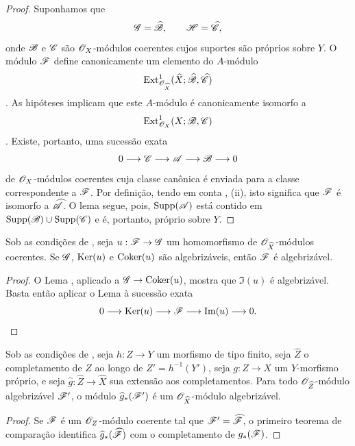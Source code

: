 \begin{proof}
Suponhamos que
\[
  \mathscr{G}=\widehat{\mathscr{B}},
  \qquad
  \mathscr{H}=\widehat{\mathscr{C}},
\]
onde $\mathscr{B}$ e $\mathscr{C}$ são $\mathscr{O}_X$-módulos coerentes cujos
suportes são próprios sobre $Y$. O módulo $\mathscr{F}$ define canonicamente
um elemento do $A$-módulo
\[
  \operatorname{Ext}^1_{\mathscr{O}_{\widehat{X}}}
  (\widehat{X};\widehat{\mathscr{B}},\widehat{\mathscr{C}})
\]
. As hipóteses implicam que este $A$-módulo é
canonicamente isomorfo a
\[
  \operatorname{Ext}^1_{\mathscr{O}_X}(X;\mathscr{B},\mathscr{C})
\]
. Existe, portanto, uma sucessão exata
\[
  0\longrightarrow\mathscr{C}\longrightarrow\mathscr{A}
  \longrightarrow\mathscr{B}\longrightarrow0
\]
de $\mathscr{O}_X$-módulos coerentes cuja classe canônica é enviada para a
classe correspondente a $\mathscr{F}$. Por definição, tendo em conta
, (ii), isto significa que $\mathscr{F}$ é isomorfo a
$\widehat{\mathscr{A}}$. O lema segue, pois,
$\operatorname{Supp}(\mathscr{A})$ está contido em
$\operatorname{Supp}(\mathscr{B})\cup\operatorname{Supp}(\mathscr{C})$ e é, portanto, próprio sobre $Y$.
\end{proof}

\begin{corollary}[5.3.2]
\label{III.5.3.2}
Sob as condições de , seja
$u:\sh{F}\to\sh{G}$ um homomorfismo de
$\mathscr{O}_{\widehat{X}}$-módulos coerentes. Se $\mathscr{G}$, $\operatorname{Ker}(u)$ e
$\operatorname{Coker}(u)$ são algebrizáveis, então $\mathscr{F}$ é algebrizável.
\end{corollary}

\begin{proof}
O Lema , aplicado a
$\sh{G}\to\Coker(u)$, mostra que $\Im(u)$ é algebrizável. Basta então
aplicar o Lema  à sucessão exata
\[
  0\longrightarrow\operatorname{Ker}(u)\longrightarrow\mathscr{F}
  \longrightarrow\operatorname{Im}(u)\longrightarrow0.
\]
\end{proof}

\begin{lemma}[5.3.3]
\label{III.5.3.3}
Sob as condições de , seja $h:Z\to Y$ um
morfismo de tipo finito, seja $\widehat{Z}$ o completamento de $Z$
ao longo de $Z'=h^{-1}(Y')$, seja $g:Z\to X$ um $Y$-morfismo próprio,
e seja $\widehat{g}:\widehat{Z}\to\widehat{X}$ sua extensão aos
completamentos. Para todo $\mathscr{O}_{\widehat{Z}}$-módulo
algebrizável $\mathscr{F}'$, o módulo
$\widehat{g}_*(\mathscr{F}')$ é um
$\mathscr{O}_{\widehat{X}}$-módulo algebrizável.
\end{lemma}

\begin{proof}
Se $\mathscr{F}$ é um $\mathscr{O}_Z$-módulo coerente tal que
$\mathscr{F}'=\widehat{\mathscr{F}}$, o primeiro teorema de comparação
 identifica
$\widehat{g}_*(\widehat{\mathscr{F}})$ com o completamento de
$g_*(\mathscr{F})$.
\end{proof}

